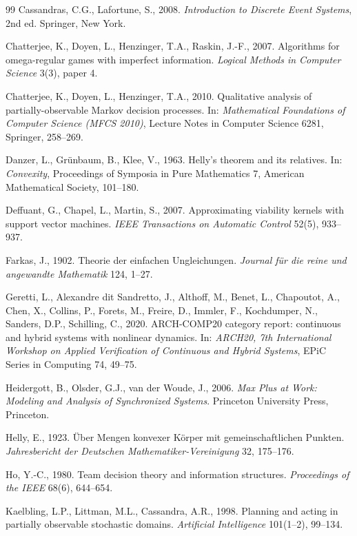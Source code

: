 \documentclass[11pt,a4paper]{article}
\theoremstyle{plain}
\theoremstyle{definition}
\theoremstyle{remark}
\begin{document}
\begin{thebibliography}{99}
 Cassandras, C.G., Lafortune, S., 2008. \emph{Introduction to Discrete Event Systems}, 2nd ed. Springer, New York.

 Chatterjee, K., Doyen, L., Henzinger, T.A., Raskin, J.-F., 2007. Algorithms for omega-regular games with imperfect information. \emph{Logical Methods in Computer Science} 3(3), paper 4.

 Chatterjee, K., Doyen, L., Henzinger, T.A., 2010. Qualitative analysis of partially-observable Markov decision processes. In: \emph{Mathematical Foundations of Computer Science (MFCS 2010)}, Lecture Notes in Computer Science 6281, Springer, 258--269.

 Danzer, L., Gr\"unbaum, B., Klee, V., 1963. Helly's theorem and its relatives. In: \emph{Convexity}, Proceedings of Symposia in Pure Mathematics 7, American Mathematical Society, 101--180.

 Deffuant, G., Chapel, L., Martin, S., 2007. Approximating viability kernels with support vector machines. \emph{IEEE Transactions on Automatic Control} 52(5), 933--937.

 Farkas, J., 1902. Theorie der einfachen Ungleichungen. \emph{Journal f\"ur die reine und angewandte Mathematik} 124, 1--27.

 Geretti, L., Alexandre dit Sandretto, J., Althoff, M., Benet, L., Chapoutot, A., Chen, X., Collins, P., Forets, M., Freire, D., Immler, F., Kochdumper, N., Sanders, D.P., Schilling, C., 2020. ARCH-COMP20 category report: continuous and hybrid systems with nonlinear dynamics. In: \emph{ARCH20, 7th International Workshop on Applied Verification of Continuous and Hybrid Systems}, EPiC Series in Computing 74, 49--75.

 Heidergott, B., Olsder, G.J., van der Woude, J., 2006. \emph{Max Plus at Work: Modeling and Analysis of Synchronized Systems}. Princeton University Press, Princeton.

 Helly, E., 1923. \"Uber Mengen konvexer K\"orper mit gemeinschaftlichen Punkten. \emph{Jahresbericht der Deutschen Mathematiker-Vereinigung} 32, 175--176.

 Ho, Y.-C., 1980. Team decision theory and information structures. \emph{Proceedings of the IEEE} 68(6), 644--654.

 Kaelbling, L.P., Littman, M.L., Cassandra, A.R., 1998. Planning and acting in partially observable stochastic domains. \emph{Artificial Intelligence} 101(1--2), 99--134.


\end{thebibliography}
\end{document}
